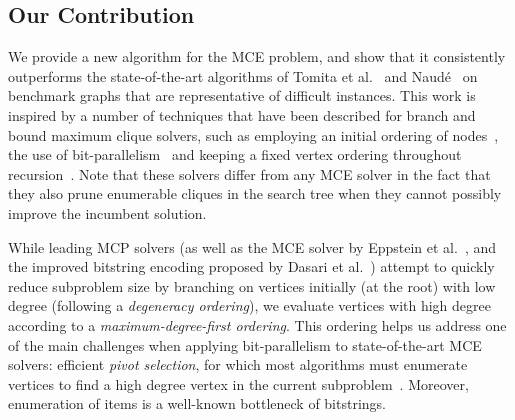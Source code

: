 \documentclass[final,1p]{elsarticle-modified}
\begin{document}

\subsection{Our Contribution}

We provide a new algorithm for the MCE problem, and show that it consistently outperforms the state-of-the-art algorithms of Tomita et al.~\cite{tomita-2006} and Naud\'e~\cite{naude-2016} on benchmark graphs that are representative of difficult instances. 
%
This work is inspired by a number of techniques that have been described for branch and bound maximum clique solvers, such as employing an initial ordering of nodes~\cite{carraghan-1990,tomita-kameda-2006,tomita-seki-2003,segundo-bitboard-2011,segundo-recoloring,tomita-recoloring}, the use of bit-parallelism~\cite{segundo-bitboard-2011,segundo-recoloring} and keeping a fixed vertex ordering throughout recursion~\cite{segundo-bitboard-2011,segundo-recoloring}. Note that these solvers differ from any MCE solver in the fact that they also prune enumerable cliques in the search tree when they cannot possibly improve the incumbent solution.
%

While leading MCP solvers (as well as the MCE solver by Eppstein et al.~\cite{els-2013}, and the improved bitstring encoding proposed by Dasari et al.~\cite{dasari-2014}) attempt to quickly reduce subproblem size by branching on vertices initially (at the root) with low degree (following a \emph{degeneracy ordering}), we evaluate vertices with high degree according to a \emph{maximum-degree-first ordering}. This ordering helps us address one of the main challenges when applying bit-parallelism to state-of-the-art MCE solvers: efficient \emph{pivot selection}, for which most algorithms must enumerate vertices to find a high degree vertex in the current subproblem~\cite{tomita-2006,els-2013,cazals-karande-2006,koch2001,naude-2016,cazals-karande-tcs}. Moreover, enumeration of items is a well-known bottleneck of bitstrings.
\end{document}
